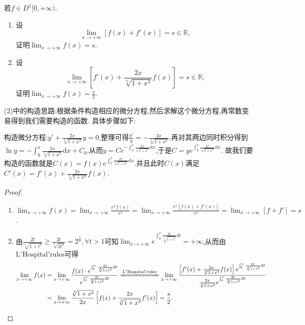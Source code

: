 \documentclass[../../main.tex]{subfiles}
\begin{document}
\begin{example}
若\(f\in D^1[0,+\infty)\).
\begin{enumerate}[(1)]
\item 设
\[
\lim_{x\rightarrow +\infty}[f(x)+f'(x)] = s\in\mathbb{R},
\]
证明\(\lim_{x\rightarrow +\infty}f(x)=s\).

\item 设
\[
\lim_{x\rightarrow +\infty}\left[f'(x)+\frac{2x}{\sqrt[3]{1 + x^{3}}}f(x)\right]=s\in\mathbb{R},
\]
证明\(\lim_{x\rightarrow +\infty}f(x)=\frac{s}{2}\).
\end{enumerate}
\end{example}
\begin{note}
(2)中的构造思路:根据条件构造相应的微分方程,然后求解这个微分方程,再常数变易得到我们需要构造的函数. 具体步骤如下:

构造微分方程:\(y'+\frac{2x}{\sqrt[3]{1 + x^3}}y = 0\),整理可得\(\frac{y'}{y}=-\frac{2x}{\sqrt[3]{1 + x^3}}\),再对其两边同时积分得到\(\ln y = -\int_{0}^{x}\frac{2x}{\sqrt[3]{1 + x^3}}\mathrm{d}x + C_0\).从而\(y = Ce^{-\int_{0}^{x}\frac{2x}{\sqrt[3]{1 + x^3}}\mathrm{d}x}\),于是\(C = ye^{\int_{0}^{x}\frac{2x}{\sqrt[3]{1 + x^3}}\mathrm{d}x}\).
故我们要构造的函数就是\(C(x) = f(x)e^{\int_{0}^{x}\frac{2x}{\sqrt[3]{1 + x^3}}\mathrm{d}x}\).并且此时$C(x)$满足$C'\left( x \right) =f'\left( x \right) +\frac{2x}{\sqrt[3]{1+x^3}}f\left( x \right)$.
\end{note}
\begin{proof}
\begin{enumerate}[(1)]
\item $\lim_{x\rightarrow +\infty}f(x) = \lim_{x\rightarrow +\infty}\frac{e^{x}f(x)}{e^{x}}
=\lim_{x\rightarrow +\infty}\frac{e^{x}[f(x)+f'(x)]}{e^{x}}
=\lim_{x\rightarrow +\infty}[f + f']
=s$.

\item 由$\frac{2t}{\sqrt[3]{1+t^3}}\geqslant \frac{2t}{\sqrt[3]{2t^3}}=2^{\frac{2}{3}},\forall t>1$可知$\lim_{x\rightarrow +\infty} e^{\int_0^x{\frac{2t}{\sqrt[3]{1+t^3}}\mathrm{d}t}}=+\infty$,从而由$\mathrm{L}'\mathrm{Hospital}'\mathrm{rules}$可得
\begin{align*}
\lim_{x\rightarrow +\infty} f(x)&=\lim_{x\rightarrow +\infty} \frac{f(x)\cdot e^{\int_0^x{\frac{2t}{\sqrt[3]{1+t^3}}\mathrm{d}t}}}{e^{\int_0^x{\frac{2t}{\sqrt[3]{1+t^3}}\mathrm{d}t}}}\xlongequal[]{\mathrm{L}'\mathrm{Hospital}'\mathrm{rules}}\lim_{x\rightarrow +\infty} \frac{\left[ f'(x)+\frac{2x}{\sqrt[3]{1+x^3}}f(x) \right] e^{\int_0^x{\frac{2t}{\sqrt[3]{1+t^3}}\mathrm{d}t}}}{\frac{2x}{\sqrt[3]{1+x^3}}e^{\int_0^x{\frac{2t}{\sqrt[3]{1+t^3}}\mathrm{d}t}}}
\\
&=\lim_{x\rightarrow +\infty} \frac{\sqrt[3]{1+x^3}}{2x}\left[ f(x)+\frac{2x}{\sqrt[3]{1+x^3}}f'(x) \right] =\frac{s}{2}.
\end{align*}
\end{enumerate}
\end{proof}
\end{document}

